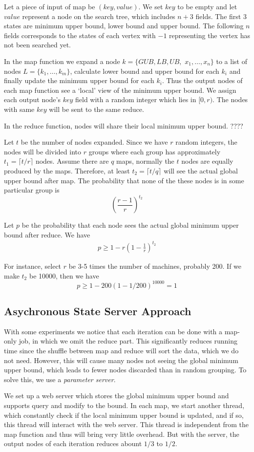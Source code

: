     Let a piece of input of map be $(key, value)$. We set $key$ to be empty and let $value$ represent a node on the search tree, which includes $n+3$ fields. The first $3$ states are minimum upper bound, lower bound and upper bound. The following $n$ fields corresponds to the states of each vertex with $-1$ representing the vertex has not been searched yet.

    In the map function we expand a node $k=\{GUB, LB, UB,$ $x_1, \dots, x_n\}$ to a list of nodes $L=\{k_1, \dots, k_m\}$, calculate lower bound and upper bound for each $k_i$ and finally update the minimum upper bound for each $k_i$. Thus the output nodes of each map function see a `local' view of the minimum upper bound. We assign each output node's $key$ field with a random integer which lies in $[0, r)$. The nodes with same $key$ will be sent to the same reduce.

    In the reduce function, nodes will share their local minimum upper bound. {\color{red}????}

    Let $t$ be the number of nodes expanded. Since we have $r$ random integers, the nodes will be divided into $r$ groups where each group has approximately $t_1=\lceil t/r \rceil$ nodes. Assume there are $q$ maps, normally the $t$ nodes are equally produced by the maps. Therefore, at least $t_2=\lceil t/q \rceil$ will see the actual global upper bound after map. The probability that none of the these nodes is in some particular group is
    \[
        \left(\frac{r-1}{r}\right)^{t_2}
    \]

    Let $p$ be the probability that each node sees the actual global minimum upper bound after reduce. We have
    \begin{align*}
        p \geq 1-r\left(1-\frac{1}{r}\right)^{t_2}
    \end{align*}

    For instance, select $r$ be 3-5 times the number of machines, probably 200. If we make $t_2$ be 10000, then we have
    \[p\geq 1-200(1-1/200)^{10000}=1\]


\subsection{Asychronous State Server Approach}
\label{state_server}
    With some experiments we notice that each iteration can be done with a map-only job, in which we omit the reduce part. This significantly reduces running time since the shuffle between map and reduce will sort the data, which we do not need. However, this will cause many nodes not seeing the global minimum upper bound, which leads to fewer nodes discarded than in random grouping. To solve this, we use a \textit{parameter server}.

    We set up a web server which stores the global minimum upper bound and supports query and modify to the bound. In each map, we start another thread, which constantly check if the local minimum upper bound is updated, and if so, this thread will interact with the web server. This thread is independent from the map function and thus will bring very little overhead. But with the server, the output nodes of each iteration reduces abount $1/3$ to $1/2$.
